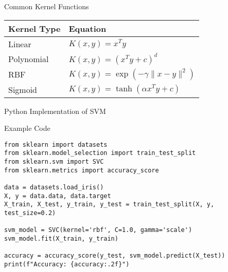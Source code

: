 \documentclass{beamer}
\begin{document}
\begin{frame}{Common Kernel Functions}
    \begin{table}[]
        \centering
        \begin{tabular}{|l|l|}
            \hline
            \textbf{Kernel Type} & \textbf{Equation} \\
            \hline
            Linear & \( K(x, y) = x^T y \) \\
            Polynomial & \( K(x, y) = (x^T y + c)^d \) \\
            RBF & \( K(x, y) = \exp(-\gamma \|x - y\|^2) \) \\
            Sigmoid & \( K(x, y) = \tanh(\alpha x^T y + c) \) \\
            \hline
        \end{tabular}
    \end{table}
\end{frame}

\begin{frame}[fragile]{Python Implementation of SVM}
    \begin{block}{Example Code}
        \small 
        \begin{verbatim}
from sklearn import datasets
from sklearn.model_selection import train_test_split
from sklearn.svm import SVC
from sklearn.metrics import accuracy_score

data = datasets.load_iris()
X, y = data.data, data.target
X_train, X_test, y_train, y_test = train_test_split(X, y, test_size=0.2)

svm_model = SVC(kernel='rbf', C=1.0, gamma='scale')
svm_model.fit(X_train, y_train)

accuracy = accuracy_score(y_test, svm_model.predict(X_test))
print(f"Accuracy: {accuracy:.2f}")
        \end{verbatim}
    \end{block}
\end{frame}
\end{document}
